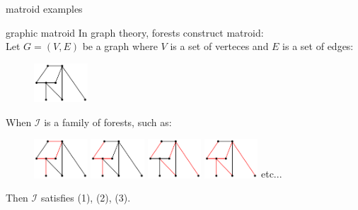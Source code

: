 \documentclass[11pt,xcolor=dvipsnames,table,dvipdfmx]{beamer}
\begin{document}
\begin{frame}{matroid examples}
 \begin{exampleblock}{graphic matroid}
  In graph theory, forests construct matroid: \\
  Let $G = (V, E)$ be a graph where $V$ is a set of verteces and $E$ is a set of edges: \\
  \begin{figure}
   \includegraphics[width=2cm]{graph.png}
  \end{figure}
  When $\mathcal{I}$ is a family of forests, such as: \\
  \begin{figure}
   \centering
   \includegraphics[width=2cm]{graph1.png}
   \includegraphics[width=2cm]{graph2.png}
   \includegraphics[width=2cm]{graph3.png}
   \includegraphics[width=2cm]{graph4.png}
   \;etc...
  \end{figure}

  Then $\mathcal{I}$ satisfies (1), (2), (3).
 \end{exampleblock}
\end{frame}
\end{document}
